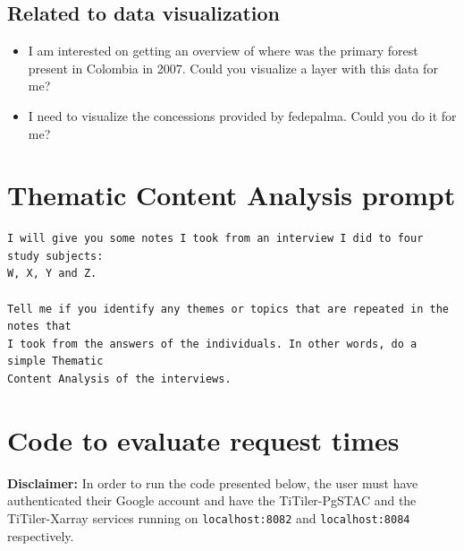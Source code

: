 \documentclass[
  oneside,
  open=any]{scrbook}
\providecommand{\tightlist}{%
  \setlength{\itemsep}{0pt}\setlength{\parskip}{0pt}}\usepackage{longtable,booktabs,array}
\begin{document}
\subsection*{Related to data
visualization}\label{related-to-data-visualization}

\begin{itemize}
\tightlist
\item
  I am interested on getting an overview of where was the primary forest
  present in Colombia in 2007. Could you visualize a layer with this
  data for me?
\item
  I need to visualize the concessions provided by fedepalma. Could you
  do it for me?
\end{itemize}

\section{Thematic Content Analysis prompt}\label{sec-gpt-prompt}

\begin{verbatim}
I will give you some notes I took from an interview I did to four study subjects:
W, X, Y and Z.

Tell me if you identify any themes or topics that are repeated in the notes that 
I took from the answers of the individuals. In other words, do a simple Thematic
Content Analysis of the interviews.
\end{verbatim}

\section{Code to evaluate request times}\label{sec-request-code}

\textbf{Disclaimer:} In order to run the code presented below, the user
must have authenticated their Google account and have the TiTiler-PgSTAC
and the TiTiler-Xarray services running on \texttt{localhost:8082} and
\texttt{localhost:8084} respectively.
\end{document}
